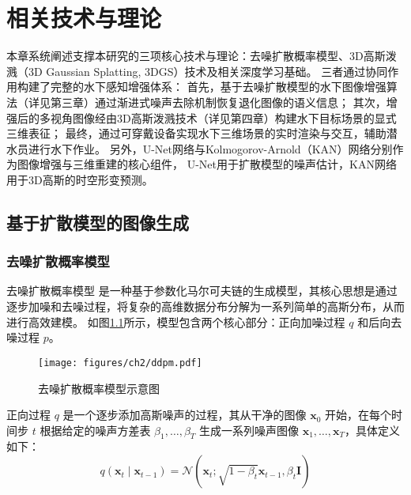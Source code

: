 
\chapter{相关技术与理论}
本章系统阐述支撑本研究的三项核心技术与理论：去噪扩散概率模型、3D高斯泼溅（3D Gaussian Splatting, 3DGS）技术及相关深度学习基础。
三者通过协同作用构建了完整的水下感知增强体系：
首先，基于去噪扩散模型的水下图像增强算法（详见第三章）通过渐进式噪声去除机制恢复退化图像的语义信息；
其次，增强后的多视角图像经由3D高斯泼溅技术（详见第四章）构建水下目标场景的显式三维表征；
最终，通过可穿戴设备实现水下三维场景的实时渲染与交互，辅助潜水员进行水下作业。
另外，U-Net网络与Kolmogorov-Arnold（KAN）网络分别作为图像增强与三维重建的核心组件，
U-Net用于扩散模型的噪声估计，KAN网络用于3D高斯的时空形变预测。


\section{基于扩散模型的图像生成}

\subsection{去噪扩散概率模型}
去噪扩散概率模型\cite{pre_ddpm}\cite{ddpm} 是一种基于参数化马尔可夫链的生成模型，其核心思想是通过逐步加噪和去噪过程，将复杂的高维数据分布分解为一系列简单的高斯分布，从而进行高效建模。
如图\ref{img:ddpm}所示，模型包含两个核心部分：正向加噪过程 $q$ 和后向去噪过程 $p$。
\begin{figure}
    \centering
    \texttt{[image: figures/ch2/ddpm.pdf]}
    \vspace{2mm}
    \caption{去噪扩散概率模型示意图}
    \label{img:ddpm}
\end{figure}

正向过程 $q$ 是一个逐步添加高斯噪声的过程，其从干净的图像 $\mathbf{x}_0$ 开始，在每个时间步 $t$ 根据给定的噪声方差表 $\beta_1, \dots, \beta_T$ 生成一系列噪声图像 $\mathbf{x}_1, \dots, \mathbf{x}_T$，具体定义如下：
\begin{equation}
    \label{eq:q_1step}
    q\left(\mathbf{x}_t \mid \mathbf{x}_{t-1}\right)=\mathcal{N}\left(\mathbf{x}_t ; \sqrt{1-\beta_t} \mathbf{x}_{t-1}, \beta_t \mathbf{I}\right)
\end{equation}

